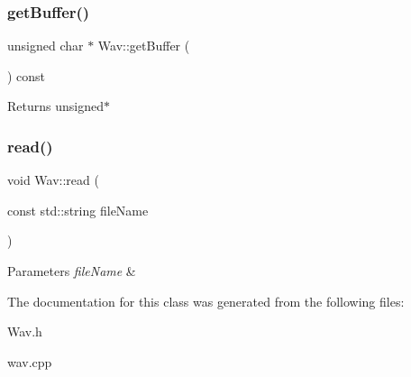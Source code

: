 \subsubsection{\texorpdfstring{get\+Buffer()}{getBuffer()}}
{\footnotesize\ttfamily unsigned char $\ast$ Wav\+::get\+Buffer (\begin{DoxyParamCaption}{ }\end{DoxyParamCaption}) const}

\begin{DoxyReturn}{Returns}
unsigned$\ast$ 
\end{DoxyReturn}
\mbox{\label{classWav_a4d3a96a00149277de8280d6008a1ba4d}} 
\subsubsection{\texorpdfstring{read()}{read()}}
{\footnotesize\ttfamily void Wav\+::read (\begin{DoxyParamCaption}\item[{const std\+::string}]{file\+Name }\end{DoxyParamCaption})}


\begin{DoxyParams}{Parameters}
{\em file\+Name} & \\
\hline
\end{DoxyParams}


The documentation for this class was generated from the following files\+:\begin{DoxyCompactItemize}
\item 
Wav.\+h\item 
wav.\+cpp\end{DoxyCompactItemize}
